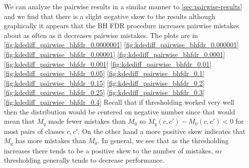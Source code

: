 \documentclass{article}
\begin{document}
We can analyze the pairwise results in a similar manner to \autoref{sec:pairwise-results} and we find that there is a slight negative skew to the results although graphically it appears that the BH FDR procedure increases pairwise mistakes about as often as it decreases
pairwise mistakes.  The plots are in
\autoref{fig:kdediff_pairwise_bhfdr_0.0000001}
\autoref{fig:kdediff_pairwise_bhfdr_0.000001}
\autoref{fig:kdediff_pairwise_bhfdr_0.00001}
\autoref{fig:kdediff_pairwise_bhfdr_0.0001}
\autoref{fig:kdediff_pairwise_bhfdr_0.001}
\autoref{fig:kdediff_pairwise_bhfdr_0.01}
\autoref{fig:kdediff_pairwise_bhfdr_0.05}
\autoref{fig:kdediff_pairwise_bhfdr_0.1}
\autoref{fig:kdediff_pairwise_bhfdr_0.15}
\autoref{fig:kdediff_pairwise_bhfdr_0.2}
\autoref{fig:kdediff_pairwise_bhfdr_0.25}
\autoref{fig:kdediff_pairwise_bhfdr_0.3}
\autoref{fig:kdediff_pairwise_bhfdr_0.4}
Recall that
if thresholding worked very well then the distribution would be
centered on negative number since that would mean that $M_q$
made fewer mistakes than $M_0$ so $M_q(c,c')-M_0(c,c')<0$ for most
pairs of classes $c,c'$.  On the other hand a more positive skew
indicates that $M_q$ has more mistakes than $M_0$.  In general, we
see that as the thresholding increases there tends to be a positive
skew to the number of mistakes, so thresholding generally tends to
decrease performance.
\end{document}
